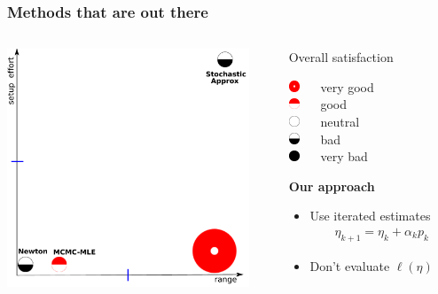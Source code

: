 \documentclass[ 10pt]{beamer}
\begin{document}
\frame
{
\frametitle{Methods that are out there}
\begin{columns}[]
\begin{column}[T]{0.6\textwidth}
\includegraphics[height=2.8in]{mck-final-overlay.pdf}
\end{column}
\begin{column}[t]{0.4\textwidth}
{\small
Overall satisfaction

\vspace{1mm}
\includegraphics[height=0.13in]{CR5.pdf} $\quad$ very good\\
\vspace{1mm}
\includegraphics[height=0.13in]{CR4.pdf} $\quad$ good\\
\vspace{1mm}
\includegraphics[height=0.13in]{CR3.pdf} $\quad$ neutral\\
\vspace{1mm}
\includegraphics[height=0.13in]{CR2.pdf} $\quad$ bad\\
\vspace{1mm}
\includegraphics[height=0.13in]{CR1.pdf} $\quad$ very bad\\
\vspace{1mm}
}
\pause

{\small
\begin{block}{
\textbf{Our approach}}
\begin{itemize}
\item Use iterated estimates
\begin{align*}
	\eta_{k+1} = \eta_k + \alpha_k p_k
\end{align*}
\item Don't evaluate $\ell( \eta)$
\vspace{1mm}


\end{itemize}
\end{block}}
\end{column}
\end{columns}}
\end{document}
